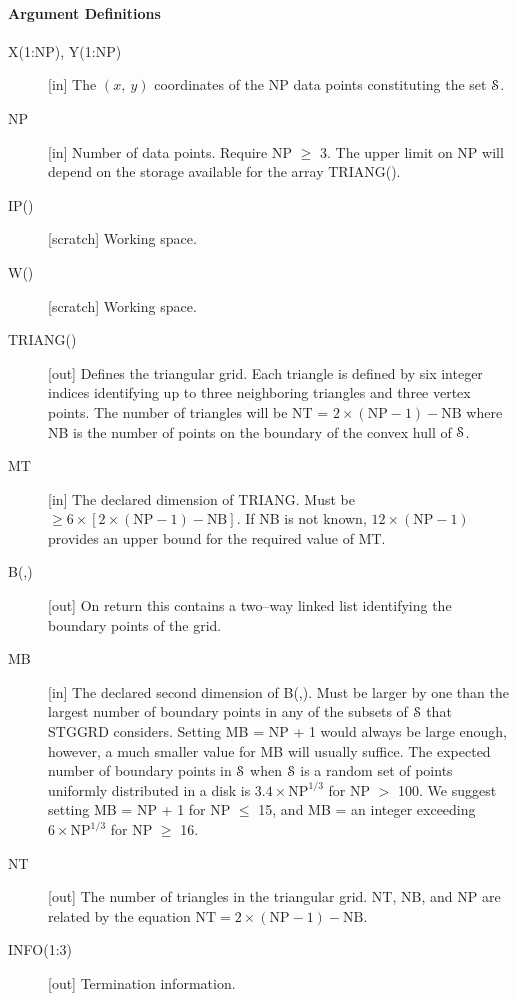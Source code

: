 \documentclass[twoside]{MATH77}
\begin{document}
\paragraph{Argument Definitions}

\begin{description}
\item[X(1:NP), Y(1:NP)] [in] The $(x,\ y)$
coordinates of the NP data points constituting the set {$\EuScript S$}.
\item[NP] [in] Number of data points.  Require NP $\geq $ 3.  The
upper limit on NP will depend on the storage available for the array
TRIANG().
\item[IP()] [scratch] Working space.
\item[W()] [scratch] Working space.
\item[TRIANG()] [out] Defines the triangular grid.
Each triangle is defined by six integer indices
identifying up to three neighboring triangles and three vertex
points.  The number of triangles will be
NT = $2\times (\text{NP}-1)-\text{NB}$
where NB is the number of points on the boundary of the convex hull
of {$\EuScript S$}.
\item[MT] [in] The declared dimension of TRIANG.  Must be $\geq
6\times[2\times(\text{NP}-1)-\text{NB}]$.  If NB is not known, $12
\times (\text{NP}-1)$ provides an upper bound for the required value of MT.
\item[B(,)] [out] On return this contains a two--way linked list
identifying the boundary points of the grid.
\item[MB] [in] The declared second dimension of B(,).  Must be larger
by one than the largest number of boundary points in any of the
subsets of {$\EuScript S$} that STGGRD considers.  Setting MB = NP + 1
would always
be large enough, however, a much smaller value for MB will usually
suffice.\newline
The expected number of boundary points in {$\EuScript S$} when
{$\EuScript S$} is a random set of
points uniformly distributed in a disk is $3.4 \times \text{NP}^{1/3}$
for NP $>$ 100.\newline
We suggest setting MB = NP + 1 for NP $\leq $ 15, and MB = an integer
exceeding $6 \times \text{NP}^{1/3}$ for NP $\geq $ 16.
\item[NT] [out] The number of triangles in the
triangular grid.  NT, NB, and NP are related by the equation
$\text{NT} = 2 \times (\text{NP} - 1) - \text{NB}.$
\item[INFO(1:3)] [out] Termination information.\vspace{-5pt}

\end{description}
\end{document}
